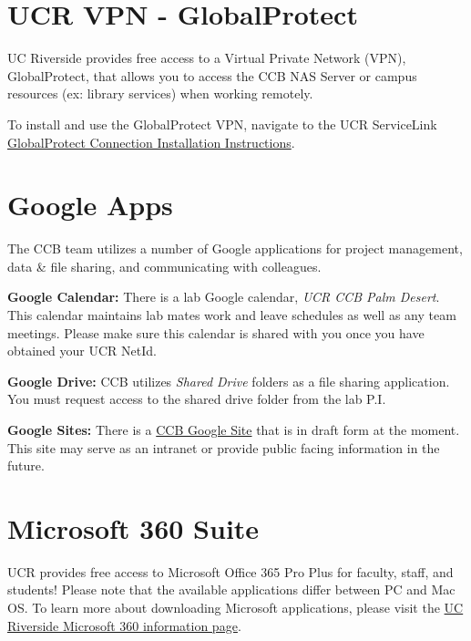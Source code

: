 \documentclass[
]{book}
\begin{document}
\hypertarget{ucr-vpn---globalprotect}{%
\section{UCR VPN - GlobalProtect}\label{ucr-vpn---globalprotect}}

UC Riverside provides free access to a Virtual Private Network (VPN), GlobalProtect, that allows you to access the CCB NAS Server or campus resources (ex: library services) when working remotely.

To install and use the GlobalProtect VPN, navigate to the UCR ServiceLink \href{https://ucrsupport.service-now.com/ucr_portal/?id=kb_article\&sys_id=8a264d791b5f0c149c0b844fdd4bcb34}{GlobalProtect Connection Installation Instructions}.

\hypertarget{google-apps}{%
\section{Google Apps}\label{google-apps}}

The CCB team utilizes a number of Google applications for project management, data \& file sharing, and communicating with colleagues.

\textbf{Google Calendar:} There is a lab Google calendar, \emph{UCR CCB Palm Desert}. This calendar maintains lab mates work and leave schedules as well as any team meetings. Please make sure this calendar is shared with you once you have obtained your UCR NetId.

\textbf{Google Drive:} CCB utilizes \emph{Shared Drive} folders as a file sharing application. You must request access to the shared drive folder from the lab P.I.

\textbf{Google Sites:} There is a \href{https://sites.google.com/ucr.edu/ccbucr/home}{CCB Google Site} that is in draft form at the moment. This site may serve as an intranet or provide public facing information in the future.

\hypertarget{microsoft-360-suite}{%
\section{Microsoft 360 Suite}\label{microsoft-360-suite}}

UCR provides free access to Microsoft Office 365 Pro Plus for faculty, staff, and students! Please note that the available applications differ between PC and Mac OS. To learn more about downloading Microsoft applications, please visit the
\href{https://ucrsupport.service-now.com/ucr_portal/?id=kb_article\&sys_id=0868da980f602f0086b7c7dce1050ee0}{UC Riverside Microsoft 360 information page}.
\end{document}
